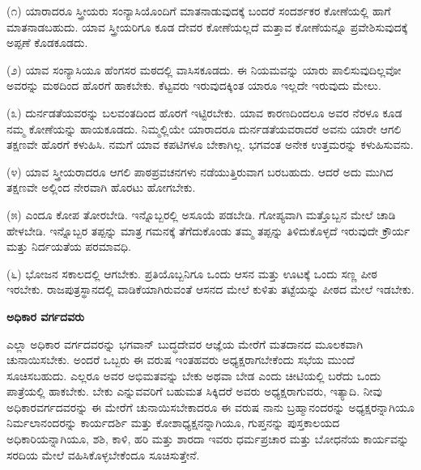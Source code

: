 (೧) ಯಾರಾದರೂ ಸ್ತ್ರೀಯರು ಸಂನ್ಯಾಸಿಯೊಂದಿಗೆ ಮಾತನಾಡುವುದಕ್ಕೆ ಬಂದರೆ ಸಂದರ್ಶಕರ ಕೋಣೆಯಲ್ಲಿ ಹಾಗೆ ಮಾತನಾಡಬಹುದು. ಯಾವ ಸ್ತ್ರೀಯರಿಗೂ ಕೂಡ ದೇವರ ಕೋಣೆಯಲ್ಲದೆ ಮತ್ತಾವ ಕೋಣೆಯನ್ನೂ ಪ್ರವೇಶಿಸುವುದಕ್ಕೆ ಅಪ್ಪಣೆ ಕೊಡಕೂಡದು.

\vspace{0.15cm}

(೨) ಯಾವ ಸಂನ್ಯಾಸಿಯೂ ಹೆಂಗಸರ ಮಠದಲ್ಲಿ ವಾಸಿಸಕೂಡದು. ಈ ನಿಯಮವನ್ನು ಯಾರು ಪಾಲಿಸುವುದಿಲ್ಲವೋ ಅವರನ್ನು ಮಠದಿಂದ ಹೊರಗೆ ಹಾಕಬೇಕು. ಕೆಟ್ಟವರು ಇರುವುದಕ್ಕಿಂತ ಯಾರೂ ಇಲ್ಲದೇ ಇರುವುದು ಮೇಲು.

\vspace{0.15cm}

(೩) ದುರ್ನಡತೆಯವರನ್ನು ಬಲವಂತದಿಂದ ಹೊರಗೆ ಇಟ್ಟಿರಬೇಕು. ಯಾವ ಕಾರಣದಿಂದಲೂ ಅವರ ನೆರಳೂ ಕೂಡ ನಮ್ಮ ಕೋಣೆಯನ್ನು ಹಾಯಕೂಡದು. ನಿಮ್ಮಲ್ಲಿಯೇ ಯಾರಾದರೂ ದುರ್ನಡತೆಯವರಾದರೆ ಅವನು ಯಾರೇ ಆಗಲಿ ತಕ್ಷಣವೇ ಹೊರಗೆ ಕಳುಹಿಸಿ. ನಮಗೆ ಯಾವ ಕಪಟಿಗಳೂ ಬೇಕಾಗಿಲ್ಲ. ಭಗವಂತ ಅನೇಕ ಉತ್ತಮರನ್ನು ಕಳುಹಿಸುವನು.

\vspace{0.15cm}

(೪) ಯಾವ ಸ್ತ್ರೀಯರಾದರೂ ಆಗಲಿ ಪಾಠಪ್ರವಚನಗಳು ನಡೆಯುತ್ತಿರುವಾಗ ಬರಬಹುದು. ಆದರೆ ಅದು ಮುಗಿದ ತಕ್ಷಣವೇ ಅಲ್ಲಿಂದ ನೇರವಾಗಿ ಹೊರಟು ಹೋಗಬೇಕು.

\vspace{0.15cm}

(೫) ಎಂದೂ ಕೋಪ ತೋರಬೇಡಿ. ಇನ್ನೊಬ್ಬರಲ್ಲಿ ಅಸೂಯೆ ಪಡಬೇಡಿ. ಗೋಪ್ಯವಾಗಿ ಮತ್ತೊಬ್ಬನ ಮೇಲೆ ಚಾಡಿ ಹೇಳಬೇಡಿ. ಇನ್ನೊಬ್ಬರ ತಪ್ಪನ್ನು ಮಾತ್ರ ಗಮನಕ್ಕೆ ತೆಗೆದುಕೊಂಡು ತಮ್ಮ ತಪ್ಪನ್ನು ತಿಳಿದುಕೊಳ್ಳದೆ ಇರುವುದೇ ಕ್ರೌರ್ಯ ಮತ್ತು ನಿರ್ದಯತೆಯ ಪರಮಾವಧಿ.

\vspace{0.15cm}

(೬) ಭೋಜನ ಸಕಾಲದಲ್ಲಿ ಆಗಬೇಕು. ಪ್ರತಿಯೊಬ್ಬನಿಗೂ ಒಂದು ಆಸನ ಮತ್ತು ಊಟಕ್ಕೆ ಒಂದು ಸಣ್ಣ ಪೀಠ ಇರಬೇಕು. ರಾಜಪುತ್ರಸ್ಥಾನದಲ್ಲಿ ವಾಡಿಕೆಯಾಗಿರುವಂತೆ ಆಸನದ ಮೇಲೆ ಕುಳಿತು ತಟ್ಟೆಯನ್ನು ಪೀಠದ ಮೇಲೆ ಇಡಬೇಕು.

\newpage


\begin{center}
\textbf{ಅಧಿಕಾರ ವರ್ಗದವರು}
\end{center}

\vspace{0.13cm}

ಎಲ್ಲಾ ಅಧಿಕಾರ ವರ್ಗದವರನ್ನು ಭಗವಾನ್ ಬುದ್ಧದೇವರ ಆಜ್ಞೆಯ ಮೇರೆಗೆ ಮತದಾನದ ಮೂಲಕವಾಗಿ ಚುನಾಯಿಸಬೇಕು. ಅಂದರೆ ಒಬ್ಬರು ಈ ವರುಷ ಇಂತಹವರು ಅಧ್ಯಕ್ಷರಾಗಬೇಕೆಂದು ಸಭೆಯ ಮುಂದೆ ಸೂಚಿಸಬಹುದು. ಎಲ್ಲರೂ ಅವರ ಅಭಿಮತವನ್ನು ಬೇಕು ಅಥವಾ ಬೇಡ ಎಂದು ಚೀಟಿಯಲ್ಲಿ ಬರೆದು ಒಂದು ಪಾತ್ರೆಯಲ್ಲಿ ಹಾಕಬೇಕು. ಬೇಕು ಎನ್ನುವವರಿಗೆ ಬಹುಮತ ಸಿಕ್ಕಿದರೆ ಅವರು ಅಧ್ಯಕ್ಷರಾಗುವರು, ಇತ್ಯಾದಿ. ನೀವು ಅಧಿಕಾರವರ್ಗದವರನ್ನು ಈ ಮೇರೆಗೆ ಚುನಾಯಿಸಬೇಕಾದರೂ ಈ ವರುಷ ನಾನು ಬ್ರಹ್ಮಾನಂದರನ್ನು ಅಧ್ಯಕ್ಷರನ್ನಾಗಿಯೂ ನಿರ್ಮಲಾನಂದರನ್ನು ಕಾರ್ಯದರ್ಶಿ ಮತ್ತು ಕೋಶಾಧ್ಯಕ್ಷನನ್ನಾಗಿಯೂ, ಗುಪ್ತನನ್ನು ಪುಸ್ತಕಾಲಯದ ಅಧಿಕಾರಿಯನ್ನಾಗಿಯೂ, ಶಶಿ, ಕಾಳಿ, ಹರಿ ಮತ್ತು ಶಾರದಾ ಇವರು ಧರ್ಮಪ್ರಚಾರ ಮತ್ತು ಬೋಧನೆಯ ಕಾರ್ಯವನ್ನು ಸರದಿಯ ಮೇಲೆ ವಹಿಸಿಕೊಳ್ಳಬೇಕೆಂದೂ ಸೂಚಿಸುತ್ತೇನೆ.

